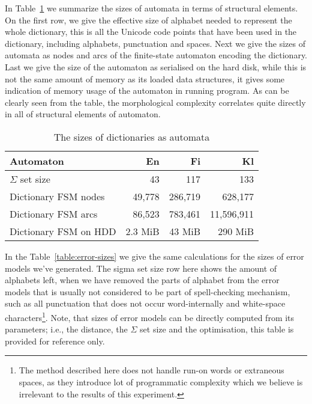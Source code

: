 \documentclass[11pt]{article}
\begin{document}
In Table~\ref{table:dictionary-sizes} we summarize the sizes of automata in
terms of structural elements. On the first row, we give the effective size of
alphabet needed to represent the whole dictionary, this is all the Unicode
code points that have been used in the dictionary, including alphabets, 
punctuation and spaces. Next we give the sizes of automata as nodes and
arcs of the finite-state automaton encoding the dictionary. Last we give the
size of the automaton as serialised on the hard disk, while this is not the
same amount of memory as its loaded data structures, it gives some indication
of memory usage of the automaton in running program. As can be clearly
seen from the table, the morphological complexity correlates quite directly
in all of structural elements of automaton.

\begin{table}[h]
\begin{center}
\begin{scriptsize}
\begin{tabular}{|l|rrr|}
\hline
\bf Automaton & \bf En & \bf Fi & \bf Kl  \\ 
\hline
$\Sigma$ set size &
 43& 117& 133
\\
Dictionary FSM nodes &
 49,778& 286,719& 628,177
\\
Dictionary FSM arcs &
 86,523& 783,461& 11,596,911
\\
Dictionary FSM on HDD & 
2.3 MiB &
43 MiB &
290 MiB
\\
\hline
\end{tabular}
\end{scriptsize}
\end{center}
\caption{\label{table:dictionary-sizes}
The sizes of dictionaries as automata}
\end{table}

In the Table~\ref{table:error-sizes} we give the same calculations for the
sizes of error models we've generated. The sigma set size row here shows the
amount of alphabets left, when we have removed the parts of alphabet from the
error models that is usually not considered to be part of spell-checking
mechanism, such as all punctuation that does not occur word-internally and
white-space characters\footnote{The method described here does not handle
run-on words or extraneous spaces, as they introduce lot of programmatic
complexity which we believe is irrelevant to the results of this experiment.}.
Note, that sizes of error models can be directly computed from its parameters;
i.e., the distance, the $\Sigma$ set size and the optimisation, this table
is provided for reference only.
\end{document}
